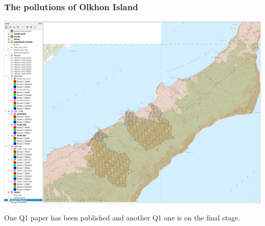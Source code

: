 \documentclass[10pt]{beamer}
\begin{document}
\begin{frame}
  \frametitle{The pollutions of Olkhon Island}
  \begin{center}
    \includegraphics[width=\linewidth]{olkhon-gis.png}
  \end{center}
  One Q1 paper has been published and another Q1 one is on the final stage.
\end{frame}


\end{document}
